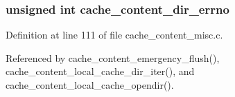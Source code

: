 \subsubsection{\setlength{\rightskip}{0pt plus 5cm}unsigned int {\bf cache\_\-content\_\-dir\_\-errno}}\label{cache__content__misc_8c_a2}




Definition at line 111 of file cache\_\-content\_\-misc.c.

Referenced by cache\_\-content\_\-emergency\_\-flush(), cache\_\-content\_\-local\_\-cache\_\-dir\_\-iter(), and cache\_\-content\_\-local\_\-cache\_\-opendir().